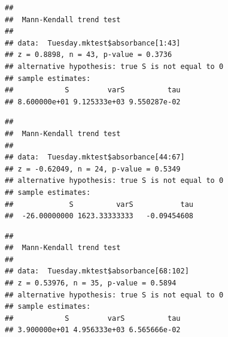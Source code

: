 \documentclass[12pt,]{article}
\newenvironment{Shaded}{\begin{snugshade}}{\end{snugshade}}
\newcommand{\KeywordTok}[1]{\textcolor[rgb]{0.13,0.29,0.53}{\textbf{#1}}}
\newcommand{\DecValTok}[1]{\textcolor[rgb]{0.00,0.00,0.81}{#1}}
\newcommand{\CommentTok}[1]{\textcolor[rgb]{0.56,0.35,0.01}{\textit{#1}}}
\newcommand{\OperatorTok}[1]{\textcolor[rgb]{0.81,0.36,0.00}{\textbf{#1}}}
\newcommand{\NormalTok}[1]{#1}
\begin{document}
\begin{Shaded}
\end{Shaded}

\begin{verbatim}
## 
##  Mann-Kendall trend test
## 
## data:  Tuesday.mktest$absorbance[1:43]
## z = 0.8898, n = 43, p-value = 0.3736
## alternative hypothesis: true S is not equal to 0
## sample estimates:
##            S         varS          tau 
## 8.600000e+01 9.125333e+03 9.550287e-02
\end{verbatim}

\begin{Shaded}
\end{Shaded}

\begin{verbatim}
## 
##  Mann-Kendall trend test
## 
## data:  Tuesday.mktest$absorbance[44:67]
## z = -0.62049, n = 24, p-value = 0.5349
## alternative hypothesis: true S is not equal to 0
## sample estimates:
##             S          varS           tau 
##  -26.00000000 1623.33333333   -0.09454608
\end{verbatim}

\begin{Shaded}
\end{Shaded}

\begin{verbatim}
## 
##  Mann-Kendall trend test
## 
## data:  Tuesday.mktest$absorbance[68:102]
## z = 0.53976, n = 35, p-value = 0.5894
## alternative hypothesis: true S is not equal to 0
## sample estimates:
##            S         varS          tau 
## 3.900000e+01 4.956333e+03 6.565666e-02
\end{verbatim}
\end{document}
